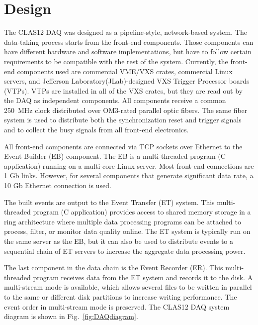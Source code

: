 \section{Design}

The CLAS12 DAQ was designed as a pipeline-style, network-based system. The data-taking process starts from the front-end components. Those components can have different hardware and software implementations, but have to follow certain requirements to be compatible with the rest of the system. Currently, the front-end components used are commercial VME/VXS crates, commercial Linux servers, and Jefferson Laboratory(JLab)-designed VXS Trigger Processor boards (VTPs). VTPs are installed in all of the VXS crates, but they are read out by the DAQ as independent components. All components receive a common 250~MHz clock distributed over OM3-rated parallel optic fibers. The same fiber system is used to distribute both the synchronization reset and trigger signals and to collect the busy signals from all front-end electronics.

All front-end components are connected via TCP sockets over Ethernet to the Event Builder (EB) component. The EB is a multi-threaded program (C application) running on a multi-core Linux server. Most front-end connections are 1 Gb links. However, for several components that generate significant data rate, a 10 Gb Ethernet connection is used.

The built events are output to the Event Transfer (ET) system. This multi-threaded program (C application) provides access to shared memory storage in a ring architecture where multiple data processing programs can be attached to process, filter, or monitor data quality online. The ET system is typically run on the same server as the EB, but it can also be used to distribute events to a sequential chain of ET servers to increase the aggregate data processing power.

The last component in the data chain is the Event Recorder (ER). This multi-threaded program receives data from the ET system and records it to the disk. A multi-stream mode is available, which allows several files to be written in parallel to the same or different disk partitions to increase writing performance. The event order in multi-stream mode is preserved. The CLAS12 DAQ system diagram is shown in Fig.~\ref{fig:DAQdiagram}.

